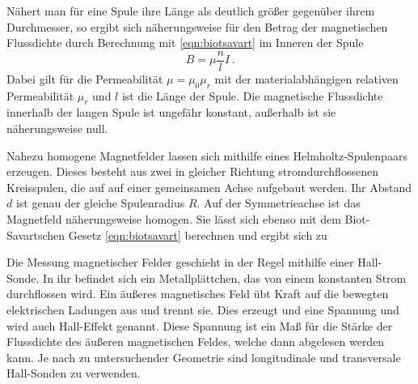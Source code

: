 Nähert man für eine Spule ihre Länge als deutlich größer gegenüber ihrem Durchmesser,
so ergibt sich näherungsweise für den Betrag der magnetischen Flussdichte durch Berechnung mit \eqref{eqn:biotsavart}
im Inneren der Spule
\begin{equation}
  B = \mu \frac{n}{l} I\,.
  \label{langespuleinnen}
\end{equation}
Dabei gilt für die Permeabilität $\mu = \mu_0 \mu_r$ mit der materialabhängigen
relativen Permeabilität $\mu_r$ und $l$ ist die Länge der Spule.
Die magnetische Flussdichte innerhalb der langen Spule ist ungefähr konstant, außerhalb
ist sie näherungsweise null.

Nahezu homogene Magnetfelder lassen sich mithilfe eines Helmholtz-Spulenpaars erzeugen.
Dieses besteht aus zwei in gleicher Richtung stromdurchflossenen Kreisspulen, die auf
auf einer gemeinsamen Achse aufgebaut werden. Ihr Abstand $d$ ist genau der gleiche Spulenradius $R$.
Auf der Symmetrieachse ist das Magnetfeld näherungsweise homogen. Sie lässt sich
ebenso mit dem Biot-Savartschen Gesetz \eqref{eqn:biotsavart} berechnen und ergibt sich zu


Die Messung magnetischer Felder geschieht in der Regel mithilfe einer Hall-Sonde.
In ihr befindet sich ein Metallplättchen, das von einem konstanten Strom durchflossen wird.
Ein äußeres magnetisches Feld übt Kraft auf die bewegten elektrischen Ladungen aus
und trennt sie. Dies erzeugt und eine Spannung und wird auch Hall-Effekt genannt.
Diese Spannung ist ein Maß für die Stärke der Flussdichte des äußeren magnetischen Feldes, welche
dann abgelesen werden kann. Je nach zu untersuchender Geometrie sind longitudinale und transversale Hall-Sonden
zu verwenden.
